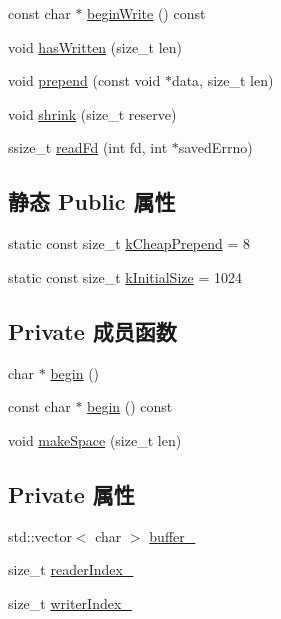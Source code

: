 \begin{DoxyCompactItemize}
const char $\ast$ \hyperlink{classmuduo_1_1Buffer_a46f79eca290d4d4cee634e3c1b50c57d}{begin\+Write} () const
\item 
void \hyperlink{classmuduo_1_1Buffer_ae29d7ca8954d0ec7da6363221c80a245}{has\+Written} (size\+\_\+t len)
\item 
void \hyperlink{classmuduo_1_1Buffer_a3099092e4d4138f55fb825a50f50f24b}{prepend} (const void $\ast$data, size\+\_\+t len)
\item 
void \hyperlink{classmuduo_1_1Buffer_a69095875ff26fe7eff163afde6eb7c9e}{shrink} (size\+\_\+t reserve)
\item 
ssize\+\_\+t \hyperlink{classmuduo_1_1Buffer_abf4ee68d9e5290cdfb7f3854387f0576}{read\+Fd} (int fd, int $\ast$saved\+Errno)
\end{DoxyCompactItemize}
\subsection*{静态 Public 属性}
\begin{DoxyCompactItemize}
\item 
static const size\+\_\+t \hyperlink{classmuduo_1_1Buffer_a7c7e801837b45cd542d00cc5ec88dcb1}{k\+Cheap\+Prepend} = 8
\item 
static const size\+\_\+t \hyperlink{classmuduo_1_1Buffer_a50181a12c6e534352c6c3cf9e0d8b331}{k\+Initial\+Size} = 1024
\end{DoxyCompactItemize}
\subsection*{Private 成员函数}
\begin{DoxyCompactItemize}
\item 
char $\ast$ \hyperlink{classmuduo_1_1Buffer_ad431daee7daddf53f8aca682ddf3c940}{begin} ()
\item 
const char $\ast$ \hyperlink{classmuduo_1_1Buffer_a5386e98f71cb440232f0c41041f50af4}{begin} () const
\item 
void \hyperlink{classmuduo_1_1Buffer_a83d5a5ce302569b35df7743314578791}{make\+Space} (size\+\_\+t len)
\end{DoxyCompactItemize}
\subsection*{Private 属性}
\begin{DoxyCompactItemize}
\item 
std\+::vector$<$ char $>$ \hyperlink{classmuduo_1_1Buffer_a906f9199a48e49dfaa86ba3e8edd0269}{buffer\+\_\+}
\item 
size\+\_\+t \hyperlink{classmuduo_1_1Buffer_a8af076cf34524e62b7392ca568468a7d}{reader\+Index\+\_\+}
\item 
size\+\_\+t \hyperlink{classmuduo_1_1Buffer_a642726abccc15af160d55735b2ed5d9a}{writer\+Index\+\_\+}
\end{DoxyCompactItemize}
